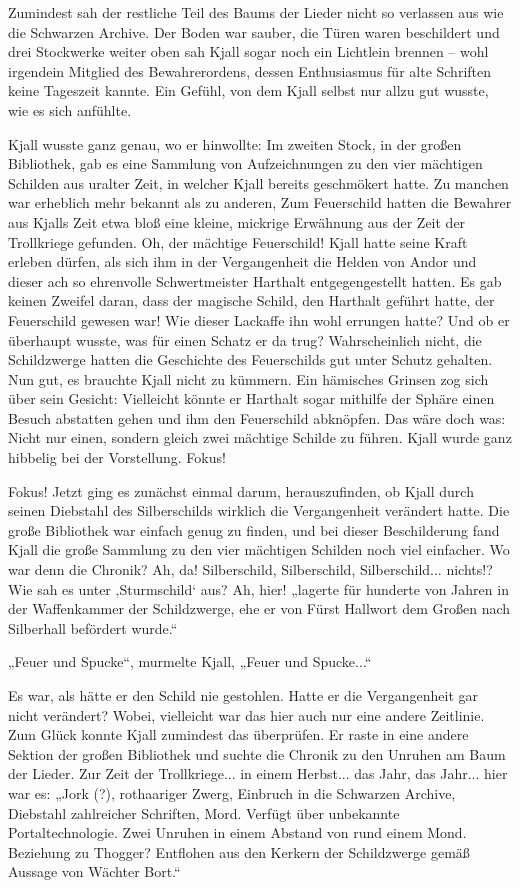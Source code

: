 \documentclass[10pt, a4paper, oneside]{book}
\begin{document}
Zumindest sah der restliche Teil des Baums der Lieder nicht so verlassen aus wie die Schwarzen Archive. Der Boden war sauber, die Türen waren beschildert und drei Stockwerke weiter oben sah Kjall sogar noch ein Lichtlein brennen – wohl irgendein Mitglied des Bewahrerordens, dessen Enthusiasmus für alte Schriften keine Tageszeit kannte. Ein Gefühl, von dem Kjall selbst nur allzu gut wusste, wie es sich anfühlte.

Kjall wusste ganz genau, wo er hinwollte: Im zweiten Stock, in der großen Bibliothek, gab es eine Sammlung von Aufzeichnungen zu den vier mächtigen Schilden aus uralter Zeit, in welcher Kjall bereits geschmökert hatte. Zu manchen war erheblich mehr bekannt als zu anderen, Zum Feuerschild hatten die Bewahrer aus Kjalls Zeit etwa bloß eine kleine, mickrige Erwähnung aus der Zeit der Trollkriege gefunden. Oh, der mächtige Feuerschild! Kjall hatte seine Kraft erleben dürfen, als sich ihm in der Vergangenheit die Helden von Andor und dieser ach so ehrenvolle Schwertmeister Harthalt entgegengestellt hatten. Es gab keinen Zweifel daran, dass der magische Schild, den Harthalt geführt hatte, der Feuerschild gewesen war! Wie dieser Lackaffe ihn wohl errungen hatte? Und ob er überhaupt wusste, was für einen Schatz er da trug? Wahrscheinlich nicht, die Schildzwerge hatten die Geschichte des Feuerschilds gut unter Schutz gehalten. Nun gut, es brauchte Kjall nicht zu kümmern. Ein hämisches Grinsen zog sich über sein Gesicht: Vielleicht könnte er Harthalt sogar mithilfe der Sphäre einen Besuch abstatten gehen und ihm den Feuerschild abknöpfen. Das wäre doch was: Nicht nur einen, sondern gleich zwei mächtige Schilde zu führen. Kjall wurde ganz hibbelig bei der Vorstellung. Fokus!

Fokus! Jetzt ging es zunächst einmal darum, herauszufinden, ob Kjall durch seinen Diebstahl des Silberschilds wirklich die Vergangenheit verändert hatte. Die große Bibliothek war einfach genug zu finden, und bei dieser Beschilderung fand Kjall die große Sammlung zu den vier mächtigen Schilden noch viel einfacher. Wo war denn die Chronik? Ah, da! Silberschild, Silberschild, Silberschild... nichts!? Wie sah es unter ‚Sturmschild‘ aus? Ah, hier! „lagerte für hunderte von Jahren in der Waffenkammer der Schildzwerge, ehe er von Fürst Hallwort dem Großen nach Silberhall befördert wurde.“

„Feuer und Spucke“, murmelte Kjall, „Feuer und Spucke...“

Es war, als hätte er den Schild nie gestohlen. Hatte er die Vergangenheit gar nicht verändert? Wobei, vielleicht war das hier auch nur eine andere Zeitlinie. Zum Glück konnte Kjall zumindest das überprüfen. Er raste in eine andere Sektion der großen Bibliothek und suchte die Chronik zu den Unruhen am Baum der Lieder. Zur Zeit der Trollkriege... in einem Herbst... das Jahr, das Jahr... hier war es: „Jork (?), rothaariger Zwerg, Einbruch in die Schwarzen Archive, Diebstahl zahlreicher Schriften, Mord. Verfügt über unbekannte Portaltechnologie. Zwei Unruhen in einem Abstand von rund einem Mond. Beziehung zu Thogger? Entflohen aus den Kerkern der Schildzwerge gemäß Aussage von Wächter Bort.“
\end{document}
